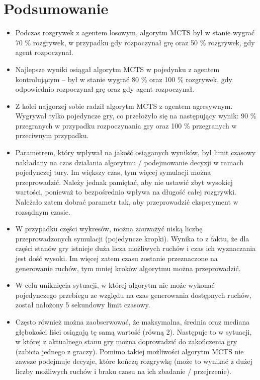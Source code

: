 \pagebreak
\section{Podsumowanie}
  \begin{itemize}
    \item{Podczas rozgrywek z agentem losowym, algorytm MCTS był w stanie wygrać 70 \% rozgrywek, w przypadku gdy rozpoczynał grę 
          oraz 50 \% rozgrywek, gdy agent rozpoczynał.}
    \item{Najlepsze wyniki osiągał algorytm MCTS w pojedynku z agentem kontrolującym -- był w stanie wygrać 80 \% oraz 100 \% 
          rozgrywek, gdy odpowiednio rozpoczynał grę oraz gdy agent rozpoczynał.}
    \item{Z kolei najgorzej sobie radził algorytm MCTS z agentem agresywnym. Wygrywał tylko pojedyncze gry, co przełożyło się na
          następujący wynik: 90 \% przegranych w przypadku rozpoczynania gry oraz 100 \% przegranych w przeciwnym przypadku.}
    \item{Parametrem, który wpływał na jakość osiąganych wyników, był limit czasowy nakładany na czas działania algorytmu / 
          podejmowanie decyzji w ramach pojedynczej tury. Im większy czas, tym więcej symulacji można przeprowadzić. Należy
          jednak pamiętać, aby nie ustawić zbyt wysokiej wartości, ponieważ to bezpośrednio wpływa na długość całej rozgrywki.
          Należało zatem dobrać parametr tak, aby przeprowadzić eksperyment w rozsądnym czasie.}
    \item{W przypadku części wykresów, można zauważyć niską liczbę przeprowadzonych symulacji (pojedyncze kropki). Wynika to
          z faktu, że dla części stanów gry istnieje duża licza możliwych ruchów i czas ich wyznaczania jest dość wysoki. Im więcej
          zatem czasu zostanie przeznaczone na generowanie ruchów, tym mniej kroków algorytmu można przeprowadzić.}
    \item{W celu uniknięcia sytuacji, w której algorytm nie może wykonać pojedynczego przebiegu ze względu na czas generowania
          dostępnych ruchów, został nałożony 5 sekundowy limit czasowy.}
    \item{Często również można zaobserwować, że maksymalna, średnia oraz mediana głębokości liści osiągają tę samą wartość (równą 2).
          Następuje to w sytuacji, w której z aktualnego stanu gry można doprowadzić do zakończenia gry (zabicia jednego z graczy).
          Pomimo takiej możliwości algorytm MCTS nie zawsze podejmuje decyzje, które kończą rozgrywkę (może to wynikać z dużej liczby
          możliwych ruchów i braku czasu na ich zbadanie / przejrzenie).}
  \end{itemize}
